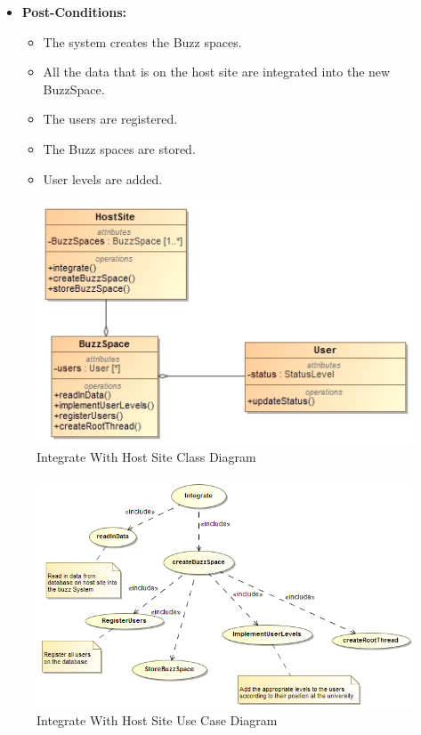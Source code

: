 \documentclass[11pt]{article}
\begin{document}
\begin{enumerate}
\begin{itemize}
\item\textbf{Post-Conditions: }
	\begin{itemize}
		\item The system creates the Buzz spaces.
		\item All the data that is on the host site are integrated into the new BuzzSpace.
		\item The users are registered.
		\item The Buzz spaces are stored.
		\item User levels are added.
	\end{itemize}
\end{itemize}
\graphicspath{ {../Diagrams/Maret/class/} }
	\begin{figure}[H]	
    	\includegraphics[scale=0.5,center]{Integrate.jpg}
    	\caption{Integrate With Host Site Class Diagram}
	\end{figure}
\graphicspath{ {../Diagrams/Maret/usecase/} }	
	\begin{figure}[H]	
    	\includegraphics[scale=0.5,center]{Integrate.png}
    	\caption{Integrate With Host Site Use Case Diagram}
	\end{figure}
	

\end{enumerate}
\end{document}

